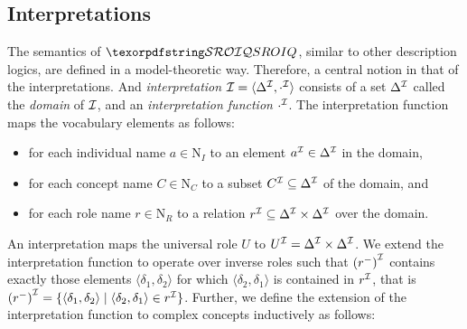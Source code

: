 \subsection{Interpretations} \label{interpretations}

The semantics of $\SROIQ$, similar to other description logics, are defined in a model-theoretic way. Therefore, a central notion in that of the interpretations. And \emph{interpretation} $\mathcal{I} = \langle \Delta^\mathcal{I}, \cdot^\mathcal{I} \rangle$ consists of a set $\Delta^\mathcal{I}$ called the \emph{domain} of $\mathcal{I}$, and an \emph{interpretation function} $\cdot^\mathcal{I}$. The interpretation function maps the vocabulary elements as follows:
\begin{itemize}
    \item for each individual name $a \in \mathrm{N}_I$ to an element $a^\mathcal{I} \in \Delta^\mathcal{I}$ in the domain,
    \item for each concept name $C \in \mathrm{N}_C$ to a subset $C^\mathcal{I} \subseteq \Delta^\mathcal{I}$ of the domain, and
    \item for each role name $r \in \mathrm{N}_R$ to a relation $r^\mathcal{I} \subseteq \Delta^\mathcal{I} \times \Delta^\mathcal{I}$ over the domain.
\end{itemize}
An interpretation maps the universal role $U$ to $U^\mathcal{I} = \Delta^\mathcal{I} \times \Delta^\mathcal{I}$. We extend the interpretation function to operate over inverse roles such that  $\left(r^-\right)^\mathcal{I}$ contains exactly those elements $\langle \delta_1, \delta_2 \rangle$ for which $\langle \delta_2, \delta_1 \rangle$ is contained in $r^\mathcal{I}$, that is  $\left(r^-\right)^\mathcal{I} = \{ \langle \delta_1, \delta_2 \rangle \mid \langle \delta_2, \delta_1 \rangle \in r^\mathcal{I} \}$. Further, we define the extension of the interpretation function to complex concepts inductively as follows:
